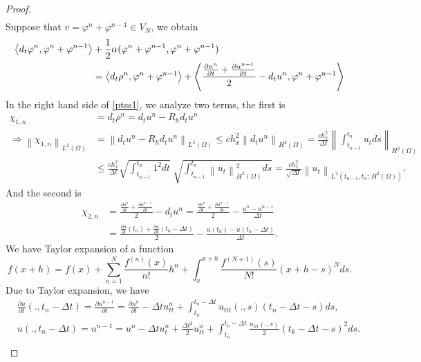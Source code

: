 \documentclass[]{article}
\begin{document}
\begin{proof}
\begin{align*}
	\end{align*}
	Suppose that $v=\varphi^n+\varphi^{n-1}\in V_N$, we obtain
	\begin{align}
		\left\langle d_t\varphi^n, \varphi^n+\varphi^{n-1}\right\rangle &+\frac{1}{2}\alpha(\varphi^n+\varphi^{n-1}, \varphi^n+\varphi^{n-1})\notag\\
		&=\left\langle d_t\rho^n, \varphi^n+\varphi^{n-1}\right\rangle+\left\langle \frac{\frac{\partial u^n}{\partial t}+\frac{\partial u^{n-1}}{\partial t}}{2}-d_tu^n, \varphi^n+\varphi^{n-1}\right\rangle \label{ptss1}
	\end{align}
	In the right hand side of \eqref{ptss1}, we analyze two terms, the first is 
	\begin{align*}
		\chi_{1,n}&=d_t\rho^n=d_tu^n-R_hd_tu^n\\
		\Rightarrow\left\|\chi_{1,n}\right\|_{L^2(\Omega)}&=\left\|d_tu^n-R_hd_tu^n\right\|_{L^2(\Omega)}\leq ch_x^2\left\|d_tu^n\right\|_{H^2(\Omega)}
		=\frac{ch_x^2}{\Delta t}\left\|\int_{t_{n-1}}^{t_n}u_tds\right\|_{H^2(\Omega)}\\
		&\leq \frac{ch_x^2}{\Delta t}\sqrt{\int_{t_{n-1}}^{t_n}1^2dt}\;\sqrt{\int_{t_{n-1}}^{t_n} \left\|u_t\right\|_{H^2(\Omega)}^2ds}=\frac{ch_x^2}{\sqrt{\Delta t}}\left\|u_t\right\|_{L^2\left(t_{n-1}, t_n;\, H^2(\Omega)\right)}.
	\end{align*}
	And the second is
	\begin{align*}
		\chi_{2,n}&=\frac{\frac{\partial u^n}{\partial t}+\frac{\partial u^{n-1}}{\partial t}}{2}-d_tu^n=\frac{\frac{\partial u^n}{\partial t}+\frac{\partial u^{n-1}}{\partial t}}{2}-\frac{u^n-u^{n-1}}{\Delta t}\\
		&=\frac{\frac{\partial u}{\partial t}(t_n)+\frac{\partial u}{\partial t}(t_n-\Delta t)}{2}-\frac{u(t_n)-u(t_n-\Delta t)}{\Delta t}.
	\end{align*}
	We have Taylor expansion of a function
	$$f(x+h)=f(x)+\sum_{n=1}^{N}\frac{f^{(n)}(x)}{n!}h^n+\int_{x}^{x+h}\frac{f^{(N+1)}(s)}{N!}(x+h-s)^Nds.$$
	Due to Taylor expansion, we have
	\begin{align*}
		&\frac{\partial u}{\partial t}(.,t_n-\Delta t)=\frac{\partial u^{n-1}}{\partial t}=\frac{\partial u^n}{\partial t}-\Delta tu_{tt}^n+\int_{t_n}^{t_n-\Delta t} u_{ttt}(.,s)(t_n-\Delta t-s)ds,\\
		&u(.,t_n-\Delta t)=u^{n-1}=u^n-\Delta tu_{t}^n+\frac{\Delta t^2}{2}u_{tt}^n+\int_{t_n}^{t_n-\Delta t} \frac{u_{ttt}(.,s)}{2}(t_k-\Delta t-s)^2ds.
	\end{align*}
	\begin{align*}

\end{align*}
\end{proof}
\end{document}
